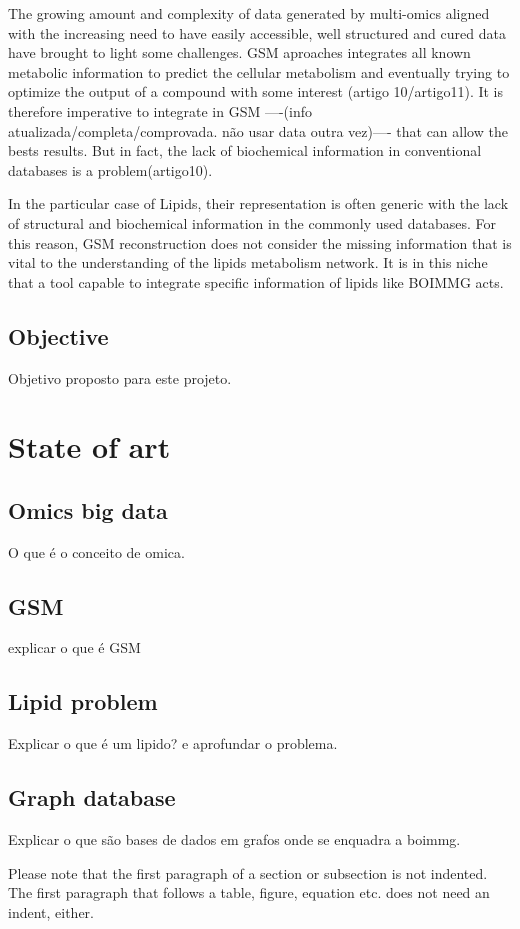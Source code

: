 \documentclass{llncs}
\begin{document}
The growing amount and complexity of data generated by multi-omics aligned with the increasing need to have easily accessible, 
well structured and cured data have brought to light some challenges. GSM aproaches integrates all known metabolic information to predict the cellular metabolism and eventually 
trying to optimize the output of a compound with some interest (artigo 10/artigo11). It is therefore imperative to integrate in GSM ----(info atualizada/completa/comprovada. não usar data outra vez)---- that can allow the bests results.
But in fact, the lack of biochemical information in conventional databases is a problem(artigo10). 

In the particular case of Lipids, their representation is often generic
with the lack of structural and biochemical information in the commonly used databases. For this reason, GSM reconstruction does not consider the missing information that is vital to the understanding of the lipids metabolism network.
It is in this niche that a tool capable to integrate specific information of lipids like BOIMMG acts.



\subsection{Objective}
Objetivo proposto para este projeto.
\section{State of art}
\subsection{Omics big data}
O que é o conceito de omica.
\subsection{GSM}
explicar o que é GSM
\subsection{Lipid problem}
Explicar o que é um lipido? e aprofundar o problema.
\subsection{Graph database}
Explicar o que são bases de dados em grafos onde se enquadra a boimmg.

Please note that the first paragraph of a section or subsection is
not indented. The first paragraph that follows a table, figure,
equation etc. does not need an indent, either.
\end{document}
